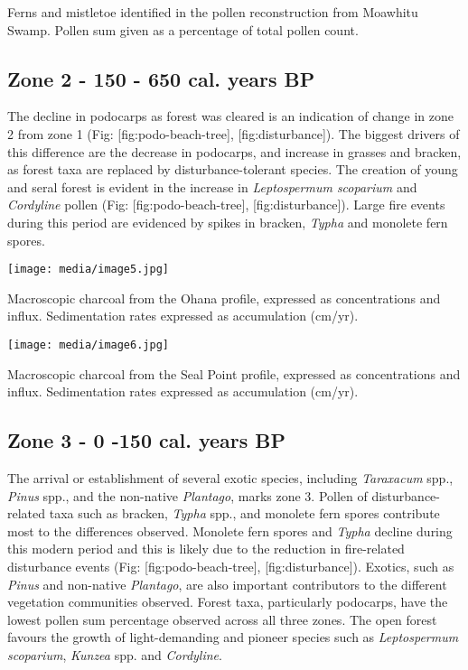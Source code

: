 \documentclass[]{article}
\begin{document}
Ferns and mistletoe identified in the pollen reconstruction from Moawhitu Swamp. Pollen sum given as a percentage of total pollen count.

\subsection{Zone 2 - 150 - 650 cal. years BP}\label{zone-2---150---650-cal.-years-bp}

The decline in podocarps as forest was cleared is an indication of change in zone 2 from zone 1 (Fig: {[}fig:podo-beach-tree{]}, {[}fig:disturbance{]}). The biggest drivers of this difference are the decrease in podocarps, and increase in grasses and bracken, as forest taxa are replaced by disturbance-tolerant species. The creation of young and seral forest is evident in the increase in \emph{Leptospermum scoparium} and \emph{Cordyline} pollen (Fig: {[}fig:podo-beach-tree{]}, {[}fig:disturbance{]}). Large fire events during this period are evidenced by spikes in bracken, \emph{Typha} and monolete fern spores.

\texttt{[image: media/image5.jpg]}

Macroscopic charcoal from the Ohana profile, expressed as concentrations and influx. Sedimentation rates expressed as accumulation (cm/yr).

\texttt{[image: media/image6.jpg]}

Macroscopic charcoal from the Seal Point profile, expressed as concentrations and influx. Sedimentation rates expressed as accumulation (cm/yr).

\subsection{Zone 3 - 0 -150 cal. years BP}\label{zone-3---0--150-cal.-years-bp}

The arrival or establishment of several exotic species, including \emph{Taraxacum} spp., \emph{Pinus} spp., and the non-native \emph{Plantago}, marks zone 3. Pollen of disturbance-related taxa such as bracken, \emph{Typha} spp., and monolete fern spores contribute most to the differences observed. Monolete fern spores and \emph{Typha} decline during this modern period and this is likely due to the reduction in fire-related disturbance events (Fig: {[}fig:podo-beach-tree{]}, {[}fig:disturbance{]}). Exotics, such as \emph{Pinus} and non-native \emph{Plantago}, are also important contributors to the different vegetation communities observed. Forest taxa, particularly podocarps, have the lowest pollen sum percentage observed across all three zones. The open forest favours the growth of light-demanding and pioneer species such as \emph{Leptospermum scoparium}, \emph{Kunzea} spp. and \emph{Cordyline}.
\end{document}

